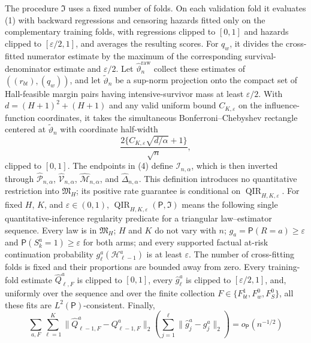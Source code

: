 The procedure \(\mathfrak I\) uses a fixed number of folds.  On each validation fold it evaluates (1) with backward regressions and censoring hazards fitted only on the complementary training folds, with regressions clipped to \([0,1]\) and hazards clipped to \([\varepsilon/2,1]\), and averages the resulting scores.  For \(q_w\), it divides the cross-fitted numerator estimate by the maximum of the corresponding survival-denominator estimate and \(\varepsilon/2\).  Let \(\widehat\vartheta_n^{\mathrm{raw}}\) collect these estimates of \(((r_{bt}),(q_w))\), and let \(\widetilde\vartheta_n\) be a sup-norm projection onto the compact set of Hall-feasible margin pairs having intensive-survivor mass at least \(\varepsilon/2\).  With \(d=(H+1)^2+(H+1)\) and any valid uniform bound \(C_{K,\varepsilon}\) on the influence-function coordinates, it takes the simultaneous Bonferroni--Chebyshev rectangle centered at \(\widetilde\vartheta_n\) with coordinate half-width
\[
 \frac{2\{C_{K,\varepsilon}\sqrt{d/\alpha}+1\}}{\sqrt n},              \tag{4}
\]
clipped to \([0,1]\).  The endpoints in (4) define \(\mathcal I_{n,\alpha}\), which is then inverted through \(\widehat{\mathcal P}_{n,\alpha}\), \(\widehat{\mathcal V}_{n,\alpha}\), \(\widehat{\mathcal M}_{n,\alpha}\), and \(\widehat\Delta_{n,\alpha}\).  This definition introduces no quantitative restriction into \(\mathfrak M_H\); its positive rate guarantee is conditional on \(\operatorname{QIR}_{H,K,\varepsilon}\).
For fixed \(H\), \(K\), and \(\varepsilon\in(0,1)\), \(\operatorname{QIR}_{H,K,\varepsilon}(\mathsf P,\mathfrak I)\) means the following single quantitative-inference regularity predicate for a triangular law--estimator sequence.  Every law is in \(\mathfrak M_H\); \(H\) and \(K\) do not vary with \(n\); \(g_a=\mathsf P(R=a)\ge\varepsilon\) and \(\mathsf P(S_k^a=1)\ge\varepsilon\) for both arms; and every supported factual at-risk continuation probability \(g_\ell^a(\mathcal H_{\ell-1}^a)\) is at least \(\varepsilon\).  The number of cross-fitting folds is fixed and their proportions are bounded away from zero.  Every training-fold estimate \(\widehat Q_{\ell,F}^a\) is clipped to \([0,1]\), every \(\widehat g_\ell^a\) is clipped to \([\varepsilon/2,1]\), and, uniformly over the sequence and over the finite collection \(F\in\{F_{bt}^1,F_w^0,F_S^0\}\), all these fits are \(L^2(\mathsf P)\)-consistent.  Finally,
\[
 \sum_{a,F}\sum_{\ell=1}^{K}
 \lVert\widehat Q_{\ell-1,F}^a-Q_{\ell-1,F}^a\rVert_2
 \left(\sum_{j=1}^{\ell}
 \lVert\widehat g_j^a-g_j^a\rVert_2\right)
 =o_{\mathsf P}(n^{-1/2})                                \tag{1}
\]
